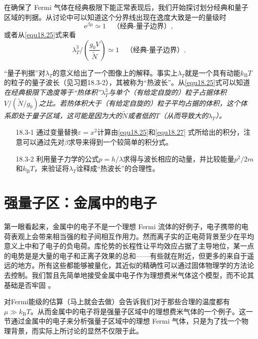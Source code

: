 在确保了 Fermi 气体在经典极限下能正常表现后，我们开始探讨划分经典和量子区域的判据。从讨论中可以知道这个分界线出现在逸度大致是一的量级时
\begin{equation}
\mathrm e^{\beta\mu}\simeq 1\quad\text{（经典-量子边界）},
\end{equation}
或者从\eqref{equ18.25}式来看
\begin{equation}
\lambda^3_T/\left(\frac{g_0V}{\tilde N}\right)\simeq 1\quad\text{（经典-量子边界）}.
\end{equation}

``量子判据''对$\lambda_T$的意义给出了一个图像上的解释。事实上$\lambda_T$就是一个具有动能$k_\text{B}T$的粒子的量子波长（见习题18.3-2），其被称为``热波长''。从\eqref{equ18.25}式可以知道{\it 在经典极限下逸度等于``热体积''$\lambda_T^3$与单个（有给定自旋的）粒子占据体积$V/(\tilde N/g_0)$之比。若热体积大于（有给定自旋的）粒子平均占据的体积，这个体系即处于量子区域，这可能是因为大的$\tilde N$或者低的$T$（从而导致大的$\lambda_T$）。}


\begin{itemize}
\item[18.3-1] 通过变量替换$\varepsilon=x^2$计算由\eqref{equ18.25}和\eqref{equ18.27}%
%
式所给出的积分，注意可以通过先对$\beta$求导来得到一个较简单的积分式。
\item[18.3-2] 利用量子力学的公式$p=h/\lambda$求得与波长相应的动量，并比较能量$p^2/2m$和$k_\text{B}T$，来验证将$\lambda_T$诠释成``热波长''的合理性。
\end{itemize}

\section{强量子区：金属中的电子}\label{sec18.4}
第一眼看起来，金属中的电子不是一个理想 Fermi 流体的好例子，电子携带的电荷表观上会带来相当强的粒子间相互作用力。然而离子实的正电荷背景至少在平均意义上中和了电子的负电荷。库伦势的长程性让平均效应占据了主导地位，某一点的电势是是大量的电子和正离子效果的总和——有些就在附近，但更多的来自于遥远的地方。所有这些都能够被量化，其近似的精确性可以通过固体物理学的方法论去控制。我们暂且先简单地接受金属中电子作为理想费米气体这个模型，而不论其基础是否牢固%
%
。

对Fermi能级的估算（马上就会去做）会告诉我们对于那些合理的温度都有$\mu\gg k_\text{B}T$。从而金属中的电子将是强量子区域中的理想费米气体的一个例子。这一节通过金属中的电子来分析强量子区域中的理想 Fermi 气体，只是为了找一个物理背景，而实际上所讨论的显然不仅限于此。


